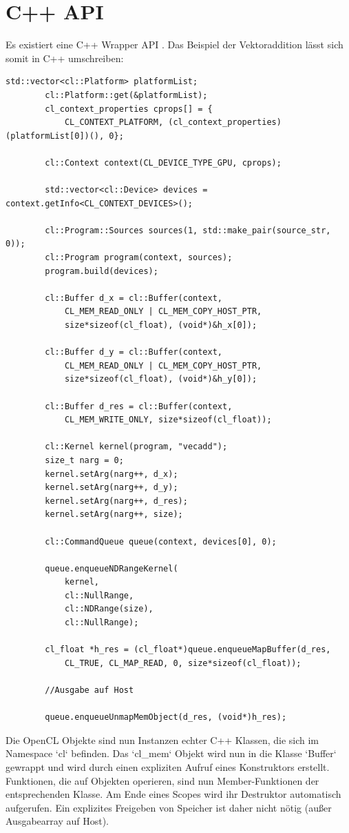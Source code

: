 	    \section{C++ API}
	    Es existiert eine C++ Wrapper \Gls{API} \autocite{oclC++API}.  Das Beispiel der Vektoraddition lässt sich somit in C++ umschreiben:
	    \begin{lstlisting}[caption=OpenCL C++ API]
	    std::vector<cl::Platform> platformList;
	    cl::Platform::get(&platformList);
	    cl_context_properties cprops[] = {
		    CL_CONTEXT_PLATFORM, (cl_context_properties)(platformList[0])(), 0};
    
	    cl::Context context(CL_DEVICE_TYPE_GPU, cprops);

	    std::vector<cl::Device> devices = context.getInfo<CL_CONTEXT_DEVICES>();

	    cl::Program::Sources sources(1, std::make_pair(source_str, 0));
	    cl::Program program(context, sources);
	    program.build(devices);

	    cl::Buffer d_x = cl::Buffer(context, 
		    CL_MEM_READ_ONLY | CL_MEM_COPY_HOST_PTR, 
		    size*sizeof(cl_float), (void*)&h_x[0]);

	    cl::Buffer d_y = cl::Buffer(context, 
		    CL_MEM_READ_ONLY | CL_MEM_COPY_HOST_PTR, 
		    size*sizeof(cl_float), (void*)&h_y[0]);

	    cl::Buffer d_res = cl::Buffer(context, 
		    CL_MEM_WRITE_ONLY, size*sizeof(cl_float));

	    cl::Kernel kernel(program, "vecadd");
	    size_t narg = 0;
	    kernel.setArg(narg++, d_x);
	    kernel.setArg(narg++, d_y);
	    kernel.setArg(narg++, d_res);
	    kernel.setArg(narg++, size);
    
	    cl::CommandQueue queue(context, devices[0], 0);

	    queue.enqueueNDRangeKernel(
		    kernel, 
		    cl::NullRange, 
		    cl::NDRange(size), 
		    cl::NullRange);
 
	    cl_float *h_res = (cl_float*)queue.enqueueMapBuffer(d_res,
		    CL_TRUE, CL_MAP_READ, 0, size*sizeof(cl_float));

	    //Ausgabe auf Host
		
	    queue.enqueueUnmapMemObject(d_res, (void*)h_res);
	    \end{lstlisting}

	    Die OpenCL Objekte sind nun Instanzen echter C++ Klassen, die sich im Namespace \li`cl` befinden. Das \li`cl_mem` Objekt wird nun in die Klasse \li`Buffer` gewrappt und wird durch einen expliziten Aufruf eines Konstruktors erstellt. Funktionen, die auf Objekten operieren, sind nun Member-Funktionen der entsprechenden Klasse. Am Ende eines Scopes wird ihr Destruktor automatisch aufgerufen. Ein explizites Freigeben von Speicher ist daher nicht nötig (außer Ausgabearray auf Host).		
		
